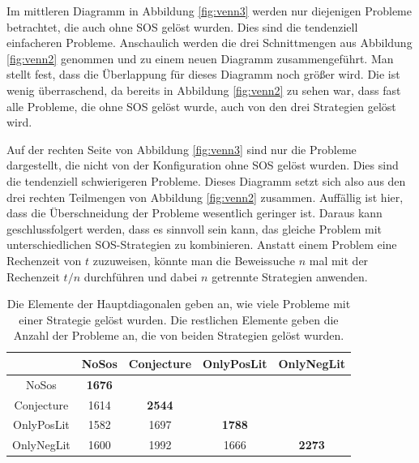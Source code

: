 		Im mittleren Diagramm in Abbildung \ref{fig:venn3} werden nur diejenigen Probleme betrachtet, die auch ohne SOS gelöst wurden. Dies sind die tendenziell einfacheren Probleme. Anschaulich werden die drei Schnittmengen aus Abbildung \ref{fig:venn2} genommen und zu einem neuen Diagramm zusammengeführt. Man stellt fest, dass die Überlappung für dieses Diagramm noch größer wird. Die ist wenig überraschend, da bereits in Abbildung \ref{fig:venn2} zu sehen war, dass fast alle Probleme, die ohne SOS gelöst wurde, auch von den drei Strategien gelöst wird.
		
		Auf der rechten Seite von Abbildung \ref{fig:venn3} sind nur die Probleme dargestellt, die nicht von der Konfiguration ohne SOS gelöst wurden. Dies sind die tendenziell schwierigeren Probleme. Dieses Diagramm setzt sich also aus den drei rechten Teilmengen von Abbildung \ref{fig:venn2} zusammen.
		Auffällig ist hier, dass die Überschneidung der Probleme wesentlich geringer ist. Daraus kann geschlussfolgert werden, dass es sinnvoll sein kann, das gleiche Problem mit unterschiedlichen SOS-Strategien zu kombinieren. Anstatt einem Problem eine Rechenzeit von $t$ zuzuweisen, könnte man die Beweissuche $n$ mal mit der Rechenzeit $t/n$ durchführen und dabei $n$ getrennte Strategien anwenden.
	
	
		\begin{table}
			\centering
			\begin{tabular}{|c|c|c|c|c|}
				\hline
				& NoSos & Conjecture & OnlyPosLit & OnlyNegLit \\ \hline
				NoSos & \textbf{1676} & & & \\ \hline
				Conjecture & 1614 & \textbf{2544} & & \\ \hline
				OnlyPosLit & 1582 & 1697 & \textbf{1788} & \\ \hline
				OnlyNegLit & 1600 & 1992 & 1666 & \textbf{2273} \\ \hline
				
			\end{tabular}
			
			\caption{Die Elemente der Hauptdiagonalen geben an, wie viele Probleme mit einer Strategie gelöst wurden. Die restlichen Elemente geben die Anzahl der Probleme an, die von beiden Strategien gelöst wurden.}
			\label{table:geloestSchnittmenge}
		\end{table}
	
